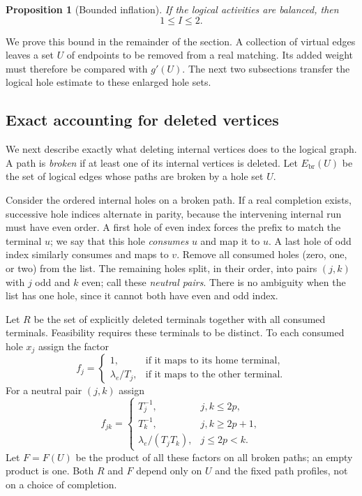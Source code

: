 \documentclass[11pt]{article}
\newtheorem{proposition}[theorem]{Proposition}
\theoremstyle{definition}
\theoremstyle{remark}
\numberwithin{equation}{section}
\begin{document}
\begin{proposition}[Bounded inflation]\label{prop:bag-inflation}
If the logical activities are balanced, then
\begin{equation}\label{eq:inflation}
 1\le I\le2.
\end{equation}
\end{proposition}

We prove this bound in the remainder of the section. A collection of
virtual edges leaves a set $U$ of endpoints to be removed from a real
matching. Its added weight must therefore be compared with $g'(U)$.
The next two subsections transfer the logical hole estimate to these
enlarged hole sets.

\subsection{Exact accounting for deleted vertices}

We next describe exactly what deleting internal vertices does to the
logical graph. A path is \emph{broken} if at least one of its internal
vertices is deleted. Let $E_{\mathrm{br}}(U)$ be the set of logical
edges whose paths are broken by a hole set $U$.

Consider the ordered internal holes on a broken path. If a real
completion exists, successive hole indices alternate in parity,
because the intervening internal run must have even order. A first
hole of even index forces the prefix to match the terminal $u$;
we say that this hole \emph{consumes} $u$ and map it to $u$.
A last hole of odd index similarly consumes and maps to $v$.
Remove all consumed holes (zero, one, or two) from the list. The remaining holes
split, in their order, into pairs $(j,k)$ with $j$ odd and $k$ even;
call these \emph{neutral pairs}. There is no ambiguity when the
list has one hole, since it cannot both have even and odd index.

Let $R$ be the set of explicitly deleted terminals together with all
consumed terminals. Feasibility requires these terminals to be
distinct. To each consumed hole $x_j$ assign the factor
\[
 f_j=
 \begin{cases}
 1,&\text{if it maps to its home terminal},\\
 \lambda_e/T_j,&\text{if it maps to the other terminal}.
 \end{cases}
\]
For a neutral pair $(j,k)$ assign
\begin{equation}\label{eq:neutral-factors}
 f_{jk}=
 \begin{cases}
 T_j^{-1},&j,k\le2p,\\
 T_k^{-1},&j,k\ge2p+1,\\
 \lambda_e/(T_jT_k),&j\le2p<k.
 \end{cases}
\end{equation}
Let $F=F(U)$ be the product of all these factors on all broken paths;
an empty product is one. Both $R$ and $F$ depend only on $U$ and
the fixed path profiles, not on a choice of completion.
\end{document}
